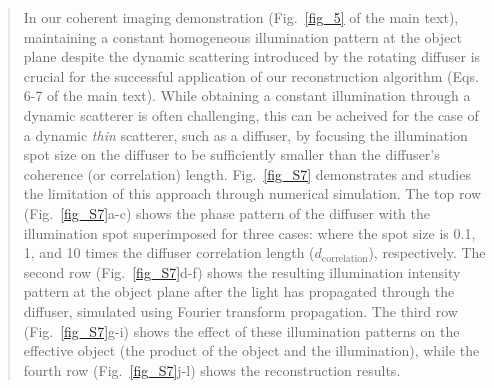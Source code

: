 \documentclass[12pt]{article}
\newenvironment{ourresponse}
    {\begin{tcolorbox}[width=\linewidth,breakable,enhanced,colback=gray!5,colframe=responsecolor!50,title=Response,left=5pt,right=5pt]}
    {\end{tcolorbox}}
\begin{document}
\begin{ourresponse}
\begin{quote}
In our coherent imaging demonstration (Fig.~\ref{fig_5} of the main text), maintaining a constant homogeneous illumination pattern at the object plane despite the dynamic scattering introduced by the rotating diffuser is crucial for the successful application of our reconstruction algorithm (Eqs. 6-7 of the main text). %
While obtaining a constant illumination through a dynamic scatterer is often challenging, this can be acheived for the case of a dynamic \textit{thin} scatterer, such as a diffuser, by focusing the illumination spot size on the diffuser to be sufficiently smaller than the  diffuser's coherence (or correlation) length.
Fig.~\ref{fig_S7} demonstrates and studies the limitation of this approach through numerical simulation. The top row (Fig.~\ref{fig_S7}a-c) shows the phase pattern of the diffuser with the illumination spot superimposed for three cases: where the spot size is 0.1, 1, and 10 times the diffuser correlation length ($d_{\text{correlation}}$), respectively. The second row (Fig.~\ref{fig_S7}d-f) shows the resulting illumination intensity pattern at the object plane after the light has propagated through the diffuser, simulated using Fourier transform propagation.
The third row (Fig.~\ref{fig_S7}g-i) shows the effect of these illumination patterns on the effective object (the product of the object and the illumination), while the fourth row (Fig.~\ref{fig_S7}j-l) shows the reconstruction results. 





\end{quote}
\end{ourresponse}
\end{document}
